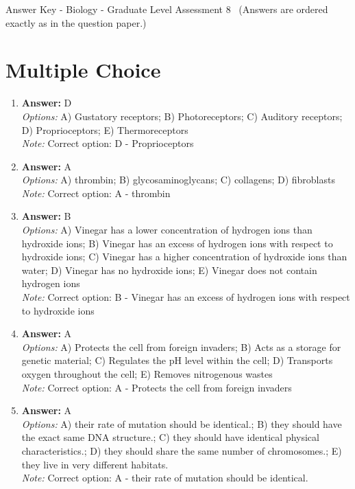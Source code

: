 \documentclass[12pt]{article}
\begin{document}
\begin{center}
Answer Key - Biology - Graduate Level Assessment 8 \
\small (Answers are ordered exactly as in the question paper.)
\end{center}

\section*{Multiple Choice}
\begin{enumerate}[label=\arabic*.]
\item \textbf{Answer:} D
\\ \textit{Options:} A) Gustatory receptors; B) Photoreceptors; C) Auditory receptors; D) Proprioceptors; E) Thermoreceptors
\\ \textit{Note:} Correct option: D - Proprioceptors
\item \textbf{Answer:} A
\\ \textit{Options:} A) thrombin; B) glycosaminoglycans; C) collagens; D) fibroblasts
\\ \textit{Note:} Correct option: A - thrombin
\item \textbf{Answer:} B
\\ \textit{Options:} A) Vinegar has a lower concentration of hydrogen ions than hydroxide ions; B) Vinegar has an excess of hydrogen ions with respect to hydroxide ions; C) Vinegar has a higher concentration of hydroxide ions than water; D) Vinegar has no hydroxide ions; E) Vinegar does not contain hydrogen ions
\\ \textit{Note:} Correct option: B - Vinegar has an excess of hydrogen ions with respect to hydroxide ions
\item \textbf{Answer:} A
\\ \textit{Options:} A) Protects the cell from foreign invaders; B) Acts as a storage for genetic material; C) Regulates the pH level within the cell; D) Transports oxygen throughout the cell; E) Removes nitrogenous wastes
\\ \textit{Note:} Correct option: A - Protects the cell from foreign invaders
\item \textbf{Answer:} A
\\ \textit{Options:} A) their rate of mutation should be identical.; B) they should have the exact same DNA structure.; C) they should have identical physical characteristics.; D) they should share the same number of chromosomes.; E) they live in very different habitats.
\\ \textit{Note:} Correct option: A - their rate of mutation should be identical.
\end{enumerate}
\end{document}
